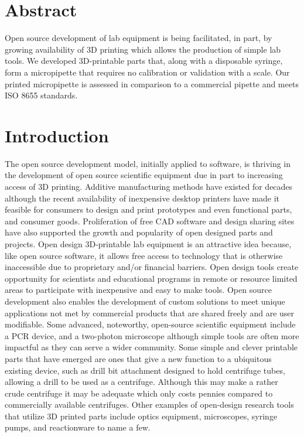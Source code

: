 \documentclass[10pt,letterpaper]{article}
\begin{document}
\section*{Abstract}
Open source development of lab equipment is being facilitated, in part, by growing availability of 3D printing which allows the production of simple lab tools.
We developed 3D-printable parts that, along with a disposable syringe, form a micropipette that requires no calibration or validation with a scale.
Our printed micropipette is assessed in comparison to a commercial pipette and meets ISO 8655 standards.

\linenumbers

\section*{Introduction}
The open source development model, initially applied to software, is thriving in the development of open source scientific equipment due in part to increasing access of 3D printing\cite{Baden2015,Pearce2013}.
Additive manufacturing methods have existed for decades although the recent availability of inexpensive desktop printers\cite{MakerbotIndustries,RepRap} have made it feasible for consumers to design and print prototypes and even functional parts, and consumer goods\cite{Fullerton2014}.
Proliferation of free CAD software\cite{OpenScad,Blender,SketchUp,123D} and design sharing sites\cite{Thingiverse,NationalInstitutesofHealth,GrabCAD,GitHubInc} have also supported the growth and popularity of open designed parts and projects.
Open design 3D-printable lab equipment is an attractive idea because, like open source software, it allows free access to technology that is otherwise inaccessible due to proprietary and/or financial barriers. 
Open design tools create opportunity for scientists and educational programs in remote or resource limited areas to participate with inexpensive and easy to make tools\cite{Baden2015}. 
Open source development also enables the development of custom solutions to meet unique applications not met by commercial products that are shared freely and are user modifiable\cite{Fullerton2014,Pearce2012}.
Some advanced, noteworthy, open-source scientific equipment include a PCR device\cite{ChaiBiotechnologiesInc2015}, and a two-photon microscope\cite{Rosenegger2014} although simple tools are often more impactful as they can serve a wider community.
Some simple and clever printable parts that have emerged are ones that give a new function to a ubiquitous existing device, such as drill bit attachment designed to hold centrifuge tubes, allowing a drill to be used as a centrifuge\cite{Garvey2009}.
Although this may make a rather crude centrifuge it may be adequate which only costs pennies compared to commercially available centrifuges.
Other examples of open-design research tools that utilize 3D printed parts include optics equipment\cite{Zhang2013}, microscopes\cite{Baden2014a,Walus2014}, syringe pumps\cite{Wijnen2014}, and reactionware\cite{Symes2012} to name a few.
\end{document}
